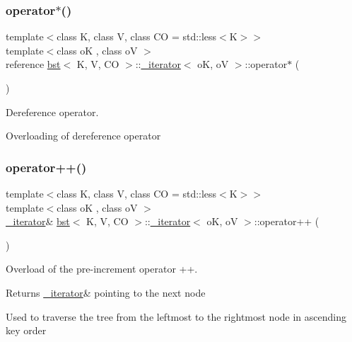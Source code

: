 \subsubsection{\texorpdfstring{operator$\ast$()}{operator*()}\hspace{0.1cm}{\footnotesize\ttfamily [2/2]}}
{\footnotesize\ttfamily template$<$class K, class V, class CO = std\+::less$<$\+K$>$$>$ \\
template$<$class oK , class oV $>$ \\
reference \hyperlink{classbst}{bst}$<$ K, V, CO $>$\+::\hyperlink{classbst_1_1__iterator}{\+\_\+iterator}$<$ oK, oV $>$\+::operator$\ast$ (\begin{DoxyParamCaption}{ }\end{DoxyParamCaption})\hspace{0.3cm}{\ttfamily [inline]}}



Dereference operator. 

Overloading of dereference operator \mbox{\label{classbst_1_1__iterator_a37378dada06d3ceb1f802ab7288cd4ce}} 
\subsubsection{\texorpdfstring{operator++()}{operator++()}\hspace{0.1cm}{\footnotesize\ttfamily [1/4]}}
{\footnotesize\ttfamily template$<$class K, class V, class CO = std\+::less$<$\+K$>$$>$ \\
template$<$class oK , class oV $>$ \\
\hyperlink{classbst_1_1__iterator}{\+\_\+iterator}\& \hyperlink{classbst}{bst}$<$ K, V, CO $>$\+::\hyperlink{classbst_1_1__iterator}{\+\_\+iterator}$<$ oK, oV $>$\+::operator++ (\begin{DoxyParamCaption}{ }\end{DoxyParamCaption})\hspace{0.3cm}{\ttfamily [inline]}}



Overload of the pre-\/increment operator ++. 

\begin{DoxyReturn}{Returns}
\hyperlink{classbst_1_1__iterator}{\+\_\+iterator}\& pointing to the next node
\end{DoxyReturn}
Used to traverse the tree from the leftmost to the rightmost node in ascending key order \mbox{\label{classbst_1_1__iterator_a8f721fc01d751f322216b7f67ac0a4df}} 
